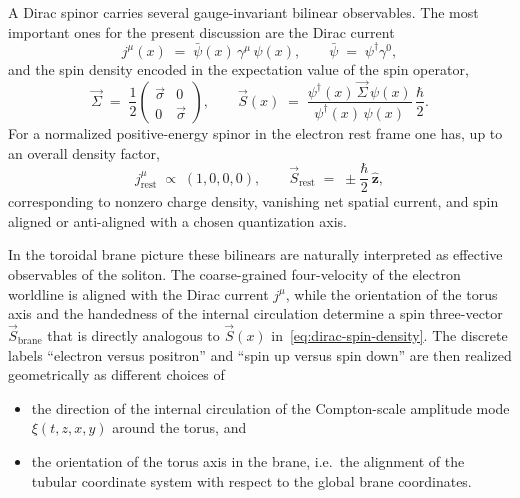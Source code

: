A Dirac spinor carries several gauge-invariant bilinear observables.
The most important ones for the present discussion are the Dirac
current
\begin{equation}
  j^\mu(x) \;=\; \bar\psi(x)\,\gamma^\mu\,\psi(x),
  \qquad
  \bar\psi \;=\; \psi^\dagger \gamma^0,
  \label{eq:dirac-current}
\end{equation}
and the spin density encoded in the expectation value of the spin
operator,
\begin{equation}
  \vec\Sigma \;=\;
  \frac{1}{2}
  \begin{pmatrix}
    \vec\sigma & 0 \\ 0 & \vec\sigma
  \end{pmatrix},
  \qquad
  \vec S(x)
  \;=\;
  \frac{\psi^\dagger(x)\,\vec\Sigma\,\psi(x)}
       {\psi^\dagger(x)\,\psi(x)}\,\frac{\hbar}{2}.
  \label{eq:dirac-spin-density}
\end{equation}
For a normalized positive-energy spinor in the electron rest frame
one has, up to an overall density factor,
\begin{equation}
  j^\mu_{\text{rest}} \;\propto\; (1,0,0,0),
  \qquad
  \vec S_{\text{rest}} \;=\; \pm \frac{\hbar}{2}\,\hat{\mathbf z},
  \label{eq:dirac-rest-bilinears}
\end{equation}
corresponding to nonzero charge density, vanishing net spatial
current, and spin aligned or anti-aligned with a chosen quantization
axis.

In the toroidal brane picture these bilinears are naturally
interpreted as effective observables of the soliton. The coarse-grained
four-velocity of the electron worldline is aligned with the Dirac
current $j^\mu$, while the orientation of the torus axis and the
handedness of the internal circulation determine a spin three-vector
$\vec S_{\text{brane}}$ that is directly analogous to
$\vec S(x)$ in~\eqref{eq:dirac-spin-density}. The discrete labels
``electron versus positron'' and ``spin up versus spin down'' are then
realized geometrically as different choices of
\begin{itemize}
  \item the direction of the internal circulation of the Compton-scale
  amplitude mode $\xi(t,z,x,y)$ around the torus, and
  \item the orientation of the torus axis in the brane, i.e.\ the
  alignment of the tubular coordinate system with respect to the
  global brane coordinates.
\end{itemize}

